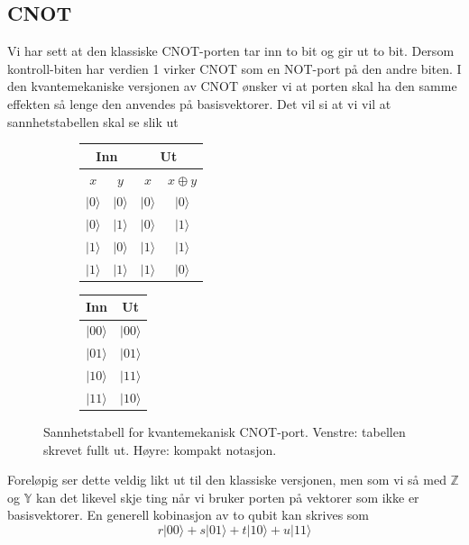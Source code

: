 \subsection{CNOT}
Vi har sett at den klassiske CNOT-porten tar inn to bit og gir ut to bit. Dersom kontroll-biten har verdien 1 virker CNOT som en NOT-port på den andre biten. I den kvantemekaniske versjonen av CNOT ønsker vi at porten skal ha den samme effekten så lenge den anvendes på basisvektorer. Det vil si at vi vil at sannhetstabellen skal se slik ut
\begin{center}
\begin{figure}[h]
\begin{subfigure}{.5\textwidth}
	\begin{tabular}{|c|c||c|c|}
		\hline
	\multicolumn{2}{|c||}{Inn} & \multicolumn{2}{|c|}{Ut} \\
	\hline
	\hline
	$x$ & $y$ & $x$ & $x\oplus y$ \\
	\hline
	\hline
	$|0\rangle$ & $|0\rangle$ & $|0\rangle$ & $|0\rangle$ \\
	$|0\rangle$ & $|1\rangle$ & $|0\rangle$ & $|1\rangle$ \\
	$|1\rangle$ & $|0\rangle$ & $|1\rangle$ & $|1\rangle$ \\
	$|1\rangle$ & $|1\rangle$ & $|1\rangle$ & $|0\rangle$ \\
	\hline
	\end{tabular}
\end{subfigure}
\begin{subfigure}{.5\textwidth}
	\begin{tabular}{|c||c|}
	\hline
	Inn & Ut \\
	\hline
	\hline
	$|00\rangle$ & $|00\rangle$ \\ 
	$|01\rangle$ & $|01\rangle$ \\ 
	$|10\rangle$ & $|11\rangle$ \\ 
	$|11\rangle$ & $|10\rangle$ \\ 
	\hline
	\end{tabular}
\end{subfigure}
\caption{Sannhetstabell for kvantemekanisk CNOT-port. Venstre: tabellen skrevet fullt ut. Høyre: kompakt notasjon.}
\end{figure}
\end{center}
Foreløpig ser dette veldig likt ut til den klassiske versjonen, men som vi så med $\mathbb{Z}$ og $\mathbb{Y}$ kan det likevel skje ting når vi bruker porten på vektorer som ikke er basisvektorer. En generell kobinasjon av to qubit kan skrives som
\begin{displaymath}
	r|00\rangle + s|01\rangle + t|10\rangle + u|11\rangle
\end{displaymath}
